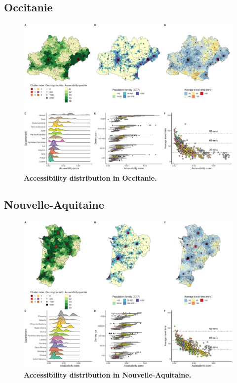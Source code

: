 \subsection*{Occitanie}

\begin{figure}[H]
    \includegraphics[width=\textwidth]{images/camion/region_accessibility/accessibility_Occitanie.png}
    \centering
    \caption{
        \textbf{Accessibility distribution in Occitanie.}
    }
\end{figure}

\subsection*{Nouvelle-Aquitaine}

\begin{figure}[H]
    \includegraphics[width=\textwidth]{images/camion/region_accessibility/accessibility_Nouvelle-Aquitaine.png}
    \centering
    \caption{
        \textbf{Accessibility distribution in Nouvelle-Aquitaine.}
    }
\end{figure}

